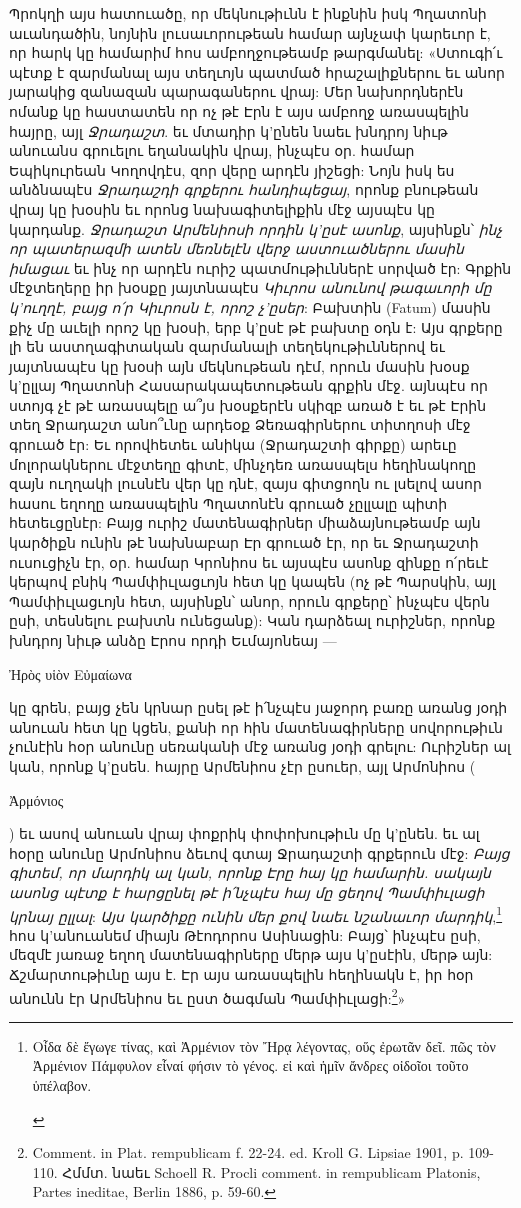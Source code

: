\documentclass{article}
\begin{document}
{Պրոկղի այս հատուածը, որ մեկնութիւնն է ինքնին իսկ Պղատոնի աւանդածին, նոյնին լուսաւորութեան համար այնչափ կարեւոր է, որ հարկ կը համարիմ հոս ամբողջութեամբ թարգմանել: «Ստուգի՛ւ պէտք է զարմանալ այս տեղւոյն պատմած հրաշալիքներու եւ անոր յարակից զանազան պարագաներու վրայ: Մեր նախորդներէն ոմանք կը հաստատեն որ ոչ թէ Էրն է այս ամբողջ առասպելին հայրը, այլ \emph{Ջրադաշտ}. եւ մտադիր կ'ընեն նաեւ խնդրոյ նիւթ անուանս գրուելու եղանակին վրայ, ինչպէս օր. համար Եպիկուրեան Կողովդէս, զոր վերը արդէն յիշեցի: Նոյն իսկ ես անձնապէս \emph{Ջրադաշդի գրքերու հանդիպեցայ}, որոնք բնութեան վրայ կը խօսին եւ որոնց նախագիտելիքին մէջ այսպէս կը կարդանք. \emph{Ջրադաշտ Արմենիոսի որդին կ'ըսէ ասոնք}, այսինքն՝ \emph{ինչ որ պատերազմի ատեն մեռնելէն վերջ աստուածներու մասին իմացաւ} եւ ինչ որ արդէն ուրիշ պատմութիւններէ սորված էր: Գրքին մէջտեղերը իր խօսքը յայտնապէս \emph{Կիւրոս անունով թագաւորի մը կ'ուղղէ, բայց ո՛ր Կիւրոսն է, որոշ չ'ըսեր}: Բախտին (Fatum) մասին քիչ մը աւելի որոշ կը խօսի, երբ կ'ըսէ թէ բախտը օդն է: Այս գրքերը լի են աստղագիտական զարմանալի տեղեկութիւններով եւ յայտնապէս կը խօսի այն մեկնութեան դէմ, որուն մասին խօսք կ'ըլլայ Պղատոնի Հասարակապետութեան գրքին մէջ. այնպէս որ ստոյգ չէ թէ առասպելը ա՞յս խօսքերէն սկիզբ առած է եւ թէ Էրին տեղ Ջրադաշտ անո՞ւնը արդեօք Ձեռագիրներու տիտղոսի մէջ գրուած էր: Եւ որովհետեւ անիկա (Ջրադաշտի գիրքը) արեւը մոլորակներու մէջտեղը գիտէ, մինչդեռ առասպելս հեղինակողը զայն ուղղակի լուսնէն վեր կը դնէ, զայս գիտցողն ու լսելով ասոր հասու եղողը առասպելին Պղատոնէն գրուած չըլլալը պիտի հետեւցընէր: Բայց ուրիշ մատենագիրներ միաձայնութեամբ այն կարծիքն ունին թէ նախնաբար Էր գրուած էր, որ եւ Ջրադաշտի ուսուցիչն էր, օր. համար Կրոնիոս եւ այսպէս ասոնք զինքը ո՛րեւէ կերպով բնիկ Պամփիւլացւոյն հետ կը կապեն (ոչ թէ Պարսկին, այլ Պամփիւլացւոյն հետ, այսինքն՝ անոր, որուն գրքերը՝ ինչպէս վերն ըսի, տեսնելու բախտն ունեցանք): Կան դարձեալ ուրիշներ, որոնք խնդրոյ նիւթ անձը Էրոս որդի Եւմայոնեայ — \begin{greek}Ἠρὸς υἱὸν Εὐμαίωνα\end{greek} կը գրեն, բայց չեն կրնար ըսել թէ ի՛նչպէս յաջորդ բառը առանց յօդի անուան հետ կը կցեն, քանի որ հին մատենագիրները սովորութիւն չունէին հօր անունը սեռականի մէջ առանց յօդի գրելու: Ուրիշներ ալ կան, որոնք կ'ըսեն. հայրը Արմենիոս չէր ըսուեր, այլ Արմոնիոս (\begin{greek}Ἀρμόνιος\end{greek}) եւ ասով անուան վրայ փոքրիկ փոփոխութիւն մը կ'ընեն. եւ ալ հօրը անունը Արմոնիոս ձեւով գտայ Ջրադաշտի գրքերուն մէջ: \emph{Բայց գիտեմ, որ մարդիկ ալ կան, որոնք Էրը հայ կը համարին. սակայն ասոնց պէտք է հարցընել թէ ի՛նչպէս հայ մը ցեղով Պամփիւլացի կրնայ ըլլալ}: \emph{Այս կարծիքը ունին մեր քով նաեւ նշանաւոր մարդիկ},\footnote{\begin{greek}Οἶδα δὲ ἔγωγε τίνας, καὶ Ἀρμένιον τὸν Ἤρᾳ λέγοντας, οὕς ἐρωτᾶν δεῖ. πῶς τὸν Ἀρμένιον Πάμφυλον εἶναί φήσιν τὸ γένος. εἰ καὶ ἡμῖν ἄνδρες οἰδοῖοι τοῦτο ὑπέλαβον.\end{greek}} հոս կ'անուանեմ միայն Թէոդորոս Ասինացին: Բայց՝ ինչպէս ըսի, մեզմէ յառաջ եղող մատենագիրները մերթ այս կ'ըսէին, մերթ այն: Ճշմարտութիւնը այս է. Էր այս առասպելին հեղինակն է, իր հօր անունն էր Արմենիոս եւ ըստ ծագման Պամփիւլացի:\footnote{Comment. in Plat. rempublicam f. 22-24. ed. Kroll G. Lipsiae 1901, p. 109-110. Հմմտ. նաեւ Schoell R. Procli comment. in rempublicam Platonis, Partes ineditae, Berlin 1886, p. 59-60.}»

}
\end{document}
